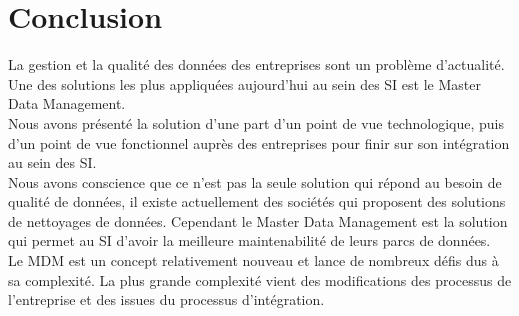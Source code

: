 \section{Conclusion}
	La gestion et la qualité des données des entreprises sont un problème d'actualité. Une des solutions les plus appliquées aujourd'hui au sein des SI est le Master Data Management. \\
Nous avons présenté la solution d'une part d'un point de vue technologique, puis d'un point de vue fonctionnel auprès des entreprises pour finir sur son intégration au sein des SI.\\
Nous avons conscience que ce n'est pas la seule solution qui répond au besoin de qualité de données, il existe actuellement des sociétés qui proposent des solutions de nettoyages de données. Cependant le Master Data Management est la solution qui permet au SI d'avoir la meilleure maintenabilité de leurs parcs de données.\\
Le MDM est un concept relativement nouveau et lance de nombreux défis dus à sa complexité. La plus grande complexité vient des modifications des processus de l'entreprise et des issues du processus d'intégration.